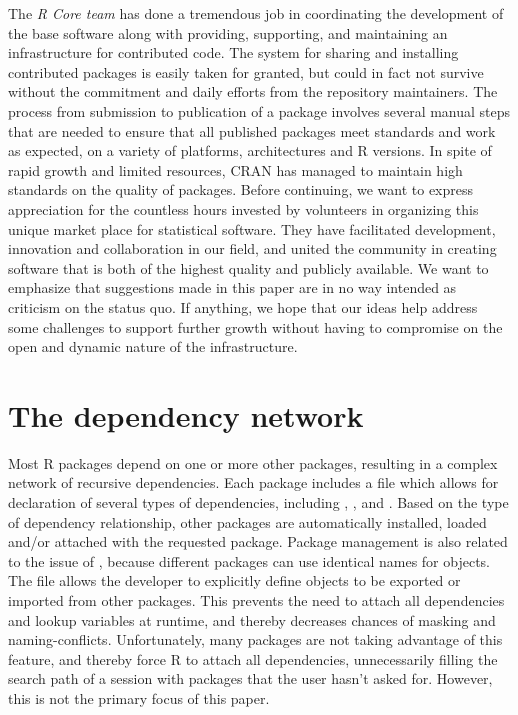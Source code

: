 The \emph{R Core team} has done a tremendous job in coordinating the
development of the base software along with providing, supporting, and maintaining an
infrastructure for contributed code. The system for sharing and installing
contributed packages is easily taken for granted, but could in fact not
survive without the commitment and daily efforts from the repository
maintainers. The process from submission to publication of a package involves
several manual steps that are needed to ensure that all published packages
meet standards and work as expected, on a variety of platforms, architectures
and R versions. In spite of rapid growth and limited resources, CRAN has
managed to maintain high standards on the quality of packages. Before
continuing, we want to express appreciation for the countless hours invested
by volunteers in organizing this unique market place for statistical software.
They have facilitated development, innovation and collaboration in our field,
and united the community in creating software that is both of the highest
quality and publicly available. We want to emphasize that suggestions made in
this paper are in no way intended as criticism on the status quo. If anything,
we hope that our ideas help address some challenges to support further growth
without having to compromise on the open and dynamic nature of the
infrastructure.

\section{The dependency network}

Most R packages depend on one or more other packages, resulting in a complex network
of recursive dependencies. Each package includes a  file
which allows for declaration of several types of dependencies, including
, ,  and . Based on
the type of dependency relationship, other packages are automatically
installed, loaded and/or attached with the requested package. Package
management is also related to the issue of , because different
packages can use identical names for objects. The  file allows
the developer to explicitly define objects to be exported or imported from
other packages. This prevents the need to attach all dependencies and lookup
variables at runtime, and thereby decreases chances of masking and
naming-conflicts. Unfortunately, many packages are not taking advantage of this
feature, and thereby force R to attach all dependencies, unnecessarily filling
the search path of a session with packages that the user hasn't asked for. However,
this is not the primary focus of this paper.

